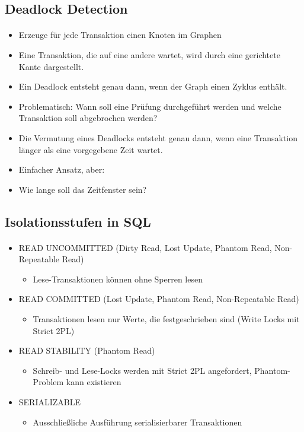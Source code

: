 \subsection{Deadlock Detection}
\begin{frame}{\insertsection}
	\framesubtitle{\insertsubsection}
\begin{itemize}
\item Erzeuge für jede Transaktion einen Knoten im Graphen
\item Eine Transaktion, die auf eine andere wartet, wird durch eine gerichtete Kante dargestellt. 
\item Ein Deadlock entsteht genau dann, wenn der Graph einen Zyklus enthält. 
\item \alert{Problematisch: Wann soll eine Prüfung durchgeführt werden und welche Transaktion soll abgebrochen werden?}
\end{itemize}
\begin{itemize}
\item Die Vermutung eines Deadlocks entsteht genau dann, wenn eine Transaktion länger als eine vorgegebene Zeit wartet. 
\item Einfacher Ansatz, aber: 
\item \alert{Wie lange soll das Zeitfenster sein?}
\end{itemize}
\end{frame}

\subsection{Isolationsstufen in SQL}

\begin{frame}{\insertsection}
	\framesubtitle{\insertsubsection}
\begin{itemize}
\item READ UNCOMMITTED (Dirty Read, Lost Update, Phantom Read, Non-Repeatable Read)
\begin{itemize}
	\item Lese-Transaktionen können ohne Sperren lesen
\end{itemize}
\item READ COMMITTED (Lost Update, Phantom Read, Non-Repeatable Read)
\begin{itemize}
	\item Transaktionen lesen nur Werte, die festgeschrieben sind (Write Locks mit Strict 2PL)
\end{itemize}
\item READ STABILITY (Phantom Read)
\begin{itemize}
	\item Schreib- und Lese-Locks werden mit Strict 2PL angefordert, Phantom-Problem kann existieren
\end{itemize}
\item SERIALIZABLE
\begin{itemize}
	\item Ausschließliche Ausführung serialisierbarer Transaktionen
\end{itemize}
\end{itemize}
\end{frame}


